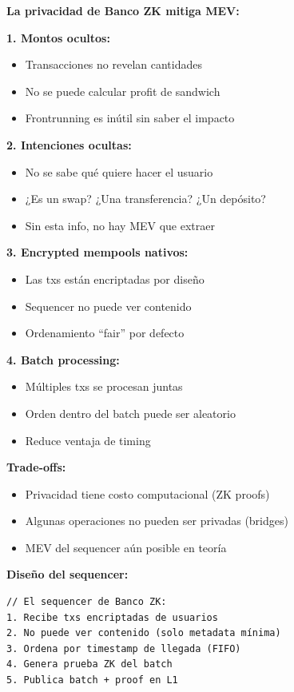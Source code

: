 \documentclass[11pt,a4paper,twoside,openright]{book}
\theoremstyle{definition}
\theoremstyle{plain}
\theoremstyle{remark}
\begin{document}
\begin{bancozk}
\textbf{La privacidad de Banco ZK mitiga MEV:}

\textbf{1. Montos ocultos:}
\begin{itemize}
    \item Transacciones no revelan cantidades
    \item No se puede calcular profit de sandwich
    \item Frontrunning es inútil sin saber el impacto
\end{itemize}

\textbf{2. Intenciones ocultas:}
\begin{itemize}
    \item No se sabe qué quiere hacer el usuario
    \item ¿Es un swap? ¿Una transferencia? ¿Un depósito?
    \item Sin esta info, no hay MEV que extraer
\end{itemize}

\textbf{3. Encrypted mempools nativos:}
\begin{itemize}
    \item Las txs están encriptadas por diseño
    \item Sequencer no puede ver contenido
    \item Ordenamiento ``fair'' por defecto
\end{itemize}

\textbf{4. Batch processing:}
\begin{itemize}
    \item Múltiples txs se procesan juntas
    \item Orden dentro del batch puede ser aleatorio
    \item Reduce ventaja de timing
\end{itemize}

\textbf{Trade-offs:}
\begin{itemize}
    \item Privacidad tiene costo computacional (ZK proofs)
    \item Algunas operaciones no pueden ser privadas (bridges)
    \item MEV del sequencer aún posible en teoría
\end{itemize}

\textbf{Diseño del sequencer:}
\begin{verbatim}
// El sequencer de Banco ZK:
1. Recibe txs encriptadas de usuarios
2. No puede ver contenido (solo metadata mínima)
3. Ordena por timestamp de llegada (FIFO)
4. Genera prueba ZK del batch
5. Publica batch + proof en L1


\end{verbatim}
\end{bancozk}
\end{document}
